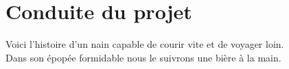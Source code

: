 \section{Conduite du projet}
Voici l'histoire d'un nain capable de courir vite et de voyager loin.\\
Dans son épopée formidable nous le suivrons une bière à la main.\\
